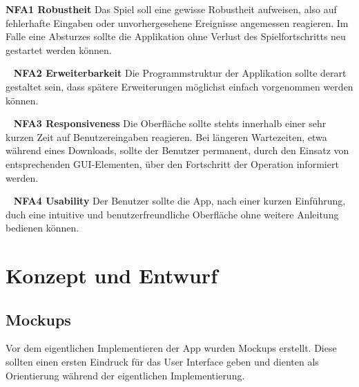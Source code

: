 \documentclass{scrartcl}
\begin{document}
\textbf{NFA1 Robustheit} \newline
Das Spiel soll eine gewisse Robustheit aufweisen, also auf fehlerhafte Eingaben
oder unvorhergesehene Ereignisse angemessen reagieren. Im Falle eine Absturzes
sollte die Applikation ohne Verlust des Spielfortschritts neu gestartet werden
können.

\ \newline
\textbf{NFA2 Erweiterbarkeit} \newline
Die Programmstruktur der Applikation sollte derart gestaltet sein, dass
spätere Erweiterungen möglichst einfach vorgenommen werden können.

\ \newline
\textbf{NFA3 Responsiveness} \newline
Die Oberfläche sollte stehts innerhalb einer sehr kurzen Zeit auf
Benutzereingaben reagieren. Bei längeren Wartezeiten, etwa während eines
Downloads, sollte der Benutzer permanent, durch den Einsatz von entsprechenden
GUI-Elementen, über den Fortschritt der Operation informiert werden.

\ \newline
\textbf{NFA4 Usability} \newline
Der Benutzer sollte die App, nach einer kurzen Einführung, duch eine intuitive
und benutzerfreundliche Oberfläche ohne weitere Anleitung bedienen können.

\section{Konzept und Entwurf}
\subsection{Mockups}
Vor dem eigentlichen Implementieren der App wurden Mockups erstellt. Diese sollten einen ersten Eindruck für das User Interface geben und dienten als Orientierung während der eigentlichen Implementierung.
\end{document}
